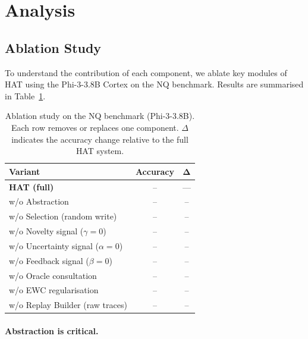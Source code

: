 \section{Analysis}
\label{sec:analysis}

\subsection{Ablation Study}
\label{sec:analysis:ablation}

To understand the contribution of each component, we ablate key modules of HAT using the Phi-3-3.8B Cortex on the NQ benchmark.
Results are summarised in Table~\ref{tab:ablation}.

\begin{table}[t]
  \centering
  \caption{Ablation study on the NQ benchmark (Phi-3-3.8B).  Each row removes or replaces one component.  $\Delta$ indicates the accuracy change relative to the full HAT system.}
  \label{tab:ablation}
  \small
  \begin{tabular}{@{}lcc@{}}
    \toprule
    \textbf{Variant} & \textbf{Accuracy} & $\bm{\Delta}$ \\
    \midrule
    \textbf{HAT (full)}                      & -- & ---    \\
    \midrule
    \quad w/o Abstraction                     & -- & --     \\
    \quad w/o Selection (random write)        & -- & --     \\
    \quad w/o Novelty signal ($\gamma = 0$)   & -- & --     \\
    \quad w/o Uncertainty signal ($\alpha = 0$)& -- & --    \\
    \quad w/o Feedback signal ($\beta = 0$)   & -- & --     \\
    \quad w/o Oracle consultation             & -- & --     \\
    \quad w/o EWC regularisation              & -- & --     \\
    \quad w/o Replay Builder (raw traces)     & -- & --     \\
    \bottomrule
  \end{tabular}
\end{table}

\paragraph{Abstraction is critical.}

